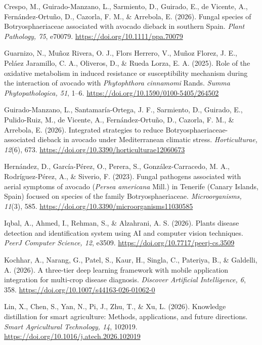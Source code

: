 \documentclass[11pt]{article}
\newcommand{\referencia}[1]{{\RaggedRight\hangindent=1.27cm\hangafter=1 #1\par}\vspace{-2pt}}
\begin{document}
\referencia{Crespo, M., Guirado-Manzano, L., Sarmiento, D., Guirado, E., de Vicente, A., Fernández-Ortuño, D., Cazorla, F. M., \& Arrebola, E. (2026). Fungal species of Botryosphaeriaceae associated with avocado dieback in southern Spain. \textit{Plant Pathology, 75}, e70079. \url{https://doi.org/10.1111/ppa.70079}}

\referencia{Guarnizo, N., Muñoz Rivera, O. J., Flors Herrero, V., Muñoz Florez, J. E., Peláez Jaramillo, C. A., Oliveros, D., \& Rueda Lorza, E. A. (2025). Role of the oxidative metabolism in induced resistance or susceptibility mechanism during the interaction of avocado with \textit{Phytophthora cinnamomi} Rands. \textit{Summa Phytopathologica, 51}, 1–6. \url{https://doi.org/10.1590/0100-5405/264502}}

\referencia{Guirado-Manzano, L., Santamaría-Ortega, J. F., Sarmiento, D., Guirado, E., Pulido-Ruiz, M., de Vicente, A., Fernández-Ortuño, D., Cazorla, F. M., \& Arrebola, E. (2026). Integrated strategies to reduce Botryosphaeriaceae-associated dieback in avocado under Mediterranean climatic stress. \textit{Horticulturae, 12}(6), 673. \url{https://doi.org/10.3390/horticulturae12060673}}

\referencia{Hernández, D., García-Pérez, O., Perera, S., González-Carracedo, M. A., Rodríguez-Pérez, A., \& Siverio, F. (2023). Fungal pathogens associated with aerial symptoms of avocado (\textit{Persea americana} Mill.) in Tenerife (Canary Islands, Spain) focused on species of the family Botryosphaeriaceae. \textit{Microorganisms, 11}(3), 585. \url{https://doi.org/10.3390/microorganisms11030585}}

\referencia{Iqbal, A., Ahmed, I., Rehman, S., \& Alzahrani, A. S. (2026). Plants disease detection and identification system using AI and computer vision techniques. \textit{PeerJ Computer Science, 12}, e3509. \url{https://doi.org/10.7717/peerj-cs.3509}}

\referencia{Kochhar, A., Narang, G., Patel, S., Kaur, H., Singla, C., Pateriya, B., \& Galdelli, A. (2026). A three-tier deep learning framework with mobile application integration for multi-crop disease diagnosis. \textit{Discover Artificial Intelligence, 6}, 358. \url{https://doi.org/10.1007/s44163-026-01062-0}}

\referencia{Lin, X., Chen, S., Yan, N., Pi, J., Zhu, T., \& Xu, L. (2026). Knowledge distillation for smart agriculture: Methods, applications, and future directions. \textit{Smart Agricultural Technology, 14}, 102019. \url{https://doi.org/10.1016/j.atech.2026.102019}}
\end{document}
